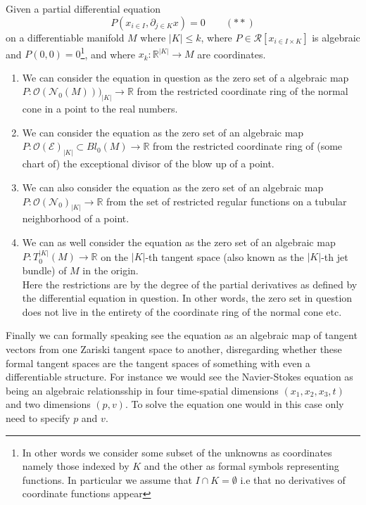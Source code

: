 \documentclass[10pt,a4paper]{amsart}
\begin{document}
Given a partial differential equation
$$P(x_{i\in I}, \partial_{j\in K} x)=0\qquad (\ast\ast)$$
on a differentiable manifold $M$ where $|K|\leq k$, where $P\in\mathcal{R}[x_{i\in I\times K}]$ is algebraic and $P(0,0)=0$\footnote{In other words we consider some subset of the unknowns as coordinates namely those indexed by $K$ and the other as formal symbols representing functions. In particular we assume that $I\cap K=\emptyset$ i.e that no derivatives of coordinate functions appear}, and where $x_k: \mathbb{R}^{|K|}\to M$ are coordinates. 
\begin{enumerate}
\item We can consider the equation in question as the zero set of a algebraic map $P: \mathcal{O}(\mathcal{N}_0(M)))_{|K|}\to \mathbb{R}$ from the restricted coordinate ring of the normal cone in a point to the real numbers.\\

\item We can consider the equation as the zero set of an algebraic map $P: \mathcal{O}(\mathcal{E})_{|K|}\subset Bl_0(M)\to \mathbb{R}$ from the restricted coordinate ring of (some chart of) the exceptional divisor of the blow up of a point. \\

\item We can also consider the equation as the zero set of an algebraic map $P: \mathcal{O}(\mathcal{N}_0)_{|K|}\to\mathbb{R}$ from the set of restricted regular functions on a tubular neighborhood of a point.\\

\item We can as well consider the equation as the zero set of an algebraic map $P: T_0^{|K|}(M)\to \mathbb{R}$ on the $|K|$-th tangent space (also known as the $|K|$-th jet bundle) of $M$ in the origin. \\

Here the restrictions are by the degree of the partial derivatives as defined by the differential equation in question. In other words, the zero set in question does not live in the entirety of the coordinate ring of the normal cone etc.\\
\end{enumerate}
Finally we can formally speaking see the equation as an algebraic map of tangent vectors from one Zariski tangent space to another, disregarding whether these formal tangent spaces are the tangent spaces of something with even a differentiable structure. For instance we would see the Navier-Stokes equation as being an algebraic relationsship in four time-spatial dimensions $(x_1, x_2, x_3, t)$ and two dimensions $(p, v)$. To solve the equation one would in this case only need to specify $p$ and $v$.\\
\end{document}
